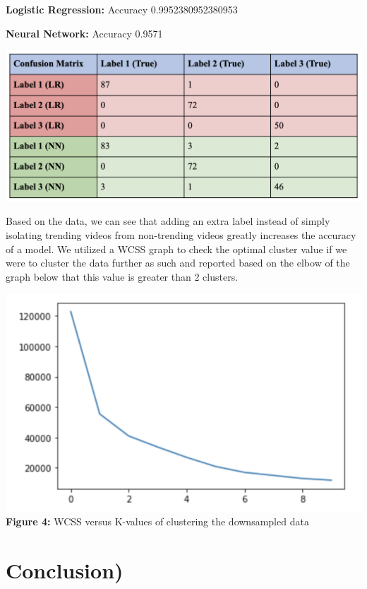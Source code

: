 \documentclass{article}
\begin{document}
\textbf{Logistic Regression:} Accuracy 0.9952380952380953
\par \textbf{Neural Network:} Accuracy 0.9571 
\begin{center}
\includegraphics[scale=.7]{multi_label.png}\\
\end{center}
\quad Based on the data, we can see that adding an extra label instead of simply isolating trending videos from non-trending videos greatly increases the accuracy of a model. We utilized a WCSS graph to check the optimal cluster value if we were to cluster the data further as such and reported based on the elbow of the graph below that this value is greater than 2 clusters.\\
\begin{center}
\includegraphics[scale=.8]{figure4.png}\\

\textbf{Figure 4:} WCSS versus K-values of clustering the downsampled data
\end{center}
\section*{Conclusion)}
\end{document}
